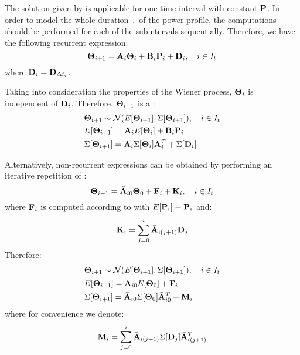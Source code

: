 The solution given by  is applicable for one time interval with constant $\mathbf{P}$. In order to model the whole duration $\period$ of the power profile, the computations should be performed for each of the subintervals sequentially. Therefore, we have the following recurrent expression:
\begin{equation} \equlabel{tta-fourier-recurrence-noise}
  \vtemperature_{i + 1} = \m{A}_i \vtemperature_i + \m{B}_i \vpower_i + \m{D}_i, \sep i \in \timeindex
\end{equation}
where $\mathbf{D}_i = \mathbf{D}_{\Delta t_i}$.

Taking into consideration the properties of the Wiener process, $\mathbf{\Theta}_i$ is independent of $\mathbf{D}_i$. Therefore, $\mathbf{\Theta}_{i+1}$ is a \mnrv:
\begin{align*}
  & \mathbf{\Theta}_{i + 1} \sim \mathcal{N}(E[\mathbf{\Theta}_{i + 1}], \Sigma[\mathbf{\Theta}_{i + 1}]), \hspace{10pt} i \in I_t \\
  & E[\mathbf{\Theta}_{i+1}] = \mathbf{A}_i E[\mathbf{\Theta}_i] + \mathbf{B}_i \mathbf{P}_i \\
  & \Sigma[\mathbf{\Theta}_{i+1}] = \mathbf{A}_i \Sigma[\mathbf{\Theta}_i] \mathbf{A}^T_i + \Sigma[\mathbf{D}_i]
\end{align*}

Alternatively, non-recurrent expressions can be obtained by performing an iterative repetition of :
\begin{equation} \equlabel{tta-fourier-noise-non-recurrent}
  \vtemperature_{i + 1} = \am{A}_{i0} \vtemperature_0 + \m{F}_i + \v{K}_i, \sep i \in \timeindex
\end{equation}
where $\mathbf{F}_i$ is computed according to  with $E[\mathbf{P}_i] \equiv \mathbf{P}_i$ and:
\begin{equation} \equlabel{k}
  \v{K}_i = \sum_{j = 0}^{i} \am{A}_{i(j+1)} \m{D}_j
\end{equation}
Therefore:
\begin{align*}
  & \mathbf{\Theta}_{i + 1} \sim \mathcal{N}(E[\mathbf{\Theta}_{i + 1}], \Sigma[\mathbf{\Theta}_{i + 1}]), \hspace{10pt} i \in I_t \\
  & E[\mathbf{\Theta}_{i + 1}] = \Bar{\mathbf{A}}_{i0} E[\mathbf{\Theta}_0] + \mathbf{F}_i \\
  & \Sigma[\mathbf{\Theta}_{i + 1}] = \Bar{\mathbf{A}}_{i0} \Sigma[\mathbf{\Theta}_0] \Bar{\mathbf{A}}_{i0}^T + \mathbf{M}_i
\end{align*}
where for convenience we denote:
\begin{equation} \equlabel{m}
  \m{M}_i = \sum_{j = 0}^{i} \am{A}_{i(j+1)} \covariance{\m{D}_j} \am{A}_{i(j+1)}^T
\end{equation}
